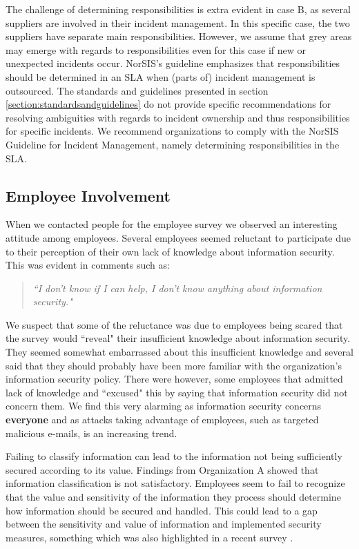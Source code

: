 The challenge of determining responsibilities is extra evident in case B, as several suppliers are involved in their incident management. In this specific case, the two suppliers have separate main responsibilities. However, we assume that grey areas may emerge with regards to responsibilities even for this case if new or unexpected incidents occur. NorSIS's guideline emphasizes that responsibilities should be determined in an SLA when (parts of) incident management is outsourced. The standards and guidelines presented in section \ref{section:standardsandguidelines} do not provide specific recommendations for resolving ambiguities with regards to incident ownership and thus responsibilities for specific incidents. We recommend organizations to comply with the NorSIS Guideline for Incident Management, namely determining responsibilities in the \ac{SLA}.


\subsection{Employee Involvement}
When we contacted people for the employee survey we observed an interesting attitude among employees. Several employees seemed reluctant to participate due to their perception of their own lack of knowledge about information security. This was evident in comments such as:

\begin{quote}
\textit{``I don't know if I can help, I don't know anything about information security."}
\end{quote}

We suspect that some of the reluctance was due to employees being scared that the survey would ``reveal" their insufficient knowledge about information security. They seemed somewhat embarrassed about this insufficient knowledge and several said that they should probably have been more familiar with the organization's information security policy. There were however, some employees that admitted lack of knowledge and ``excused" this by saying that information security did not concern them. We find this very alarming as information security concerns \textbf{everyone} and as attacks taking advantage of employees, such as targeted malicious e-mails, is an increasing trend. 

Failing to classify information can lead to the information not being sufficiently secured according to its value. Findings from Organization A showed that information classification is not satisfactory. Employees seem to fail to recognize that the value and sensitivity of the information they process should determine how information should be secured and handled. This could lead to a gap between the sensitivity and value of information and implemented security measures, something which was also highlighted in a recent survey \cite{Morketall2012}.

